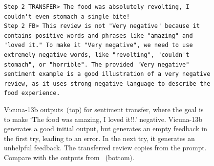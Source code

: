\begin{figure}[h]
\begin{minipage}{\textwidth}
\begin{verbatim}
Step 2 TRANSFER> The food was absolutely revolting, I couldn't even stomach a single bite!
Step 2 FB> This review is not "Very negative" because it contains positive words and phrases like "amazing" and "loved it." To make it "Very negative", we need to use extremely negative words, like "revolting", "couldn't stomach", or "horrible". The provided "Very negative" sentiment example is a good illustration of a very negative review, as it uses strong negative language to describe the food experience.
\end{verbatim}
\end{minipage}
\caption*{Vicuna-13b outputs~(top) for sentiment transfer, where the goal is to make `The food was amazing, I loved it!!.' negative. Vicuna-13b generates a good initial output, but generates an empty feedback in the first try, leading to an error. In the next try, it generates an unhelpful feedback. The transferred review copies from the prompt. Compare with the outputs from \gptf~(bottom).}
\label{fig:vicuna_failure_cases}
\end{figure}
